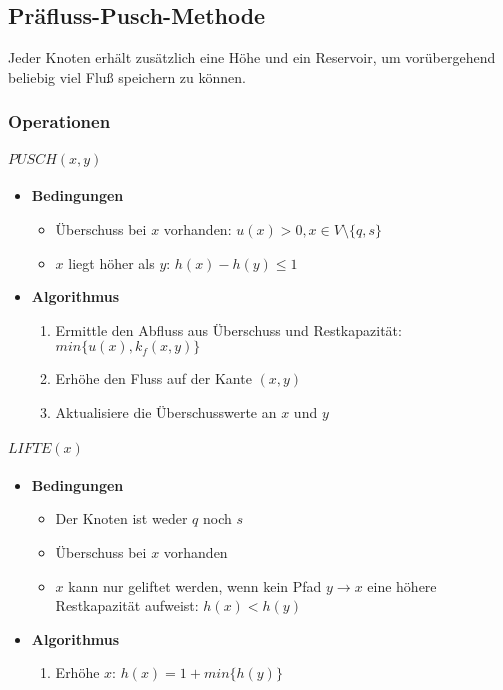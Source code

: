 \subsection{Präfluss-Pusch-Methode}
Jeder Knoten erhält zusätzlich eine Höhe und ein Reservoir, um vorübergehend beliebig viel Fluß speichern zu können.

\subsubsection{Operationen}

\paragraph{\(PUSCH(x,y)\)}
\begin{itemize}
	\item \textbf{Bedingungen}
	\begin{itemize}
		\item Überschuss bei \(x\) vorhanden: \(u(x) > 0, x \in V \setminus \{q,s\}\)
		\item \(x\) liegt höher als \(y\): \(h(x) - h(y) \leq 1\)
	\end{itemize}
	\item \textbf{Algorithmus}
	\begin{enumerate}
		\item Ermittle den Abfluss aus Überschuss und Restkapazität: \(min\{u(x), k_f(x,y)\}\)
		\item Erhöhe den Fluss auf der Kante \((x,y)\)
		\item Aktualisiere die Überschusswerte an \(x\) und \(y\)
	\end{enumerate}
\end{itemize}


\paragraph{\(LIFTE(x)\)}
\begin{itemize}
	\item \textbf{Bedingungen}
	\begin{itemize}
		\item Der Knoten ist weder \(q\) noch \(s\)
		\item Überschuss bei \(x\) vorhanden
		\item \(x\) kann nur geliftet werden, wenn kein Pfad \(y \rightarrow x\) eine höhere Restkapazität aufweist: \(h(x) < h(y)\)
	\end{itemize}
	\item \textbf{Algorithmus}
	\begin{enumerate}
		\item Erhöhe \(x\): \(h(x) = 1 + min\{h(y)\}\)
	\end{enumerate}
\end{itemize}


